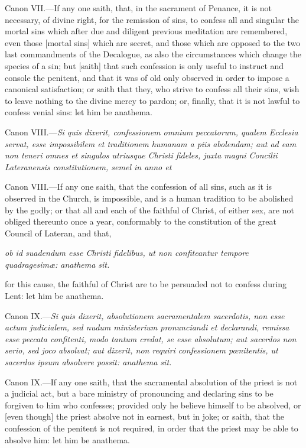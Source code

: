 Canon VII.—If any one saith, that, in the sacrament of Penance, it is not necessary, of divine right, for the remission of sins, to confess all and singular the mortal sins which after due and diligent previous meditation are remembered, even those [mortal sins] which are secret, and those which are opposed to the two last commandments of the Decalogue, as also the circumstances which change the species of a sin; but [saith] that such confession is only useful to instruct and console the penitent, and that it was of old only observed in order to impose a canonical satisfaction; or saith that they, who strive to confess all their sins, wish to leave nothing to the divine mercy to pardon; or, finally, that it is not lawful to confess venial sins: let him be anathema.

Canon VIII.—\emph{Si quis dixerit, confessionem omnium peccatorum, qualem Ecclesia servat, esse impossibilem et traditionem humanam a piis abolendam; aut ad eam non teneri omnes et singulos utriusque Christi fideles, juxta magni Concilii Lateranensis constitutionem, semel in anno et }

Canon VIII.—If any one saith, that the confession of all sins, such as it is observed in the Church, is impossible, and is a human tradition to be abolished by the godly; or that all and each of the faithful of Christ, of either sex, are not obliged thereunto once a year, conformably to the constitution of the great Council of Lateran, and that,

\emph{ob id suadendum esse Christi fidelibus, ut non confiteantur tempore quadragesimæ: anathema sit.}

for this cause, the faithful of Christ are to be persuaded not to confess during Lent: let him be anathema.

Canon IX.—\emph{Si quis dixerit, absolutionem sacramentalem sacerdotis, non esse actum judicialem, sed nudum ministerium pronunciandi et declarandi, remissa esse peccata confitenti, modo tantum credat, se esse absolutum; aut sacerdos non serio, sed joco absolvat; aut dixerit, non requiri confessionem pœnitentis, ut sacerdos ipsum absolvere possit: anathema sit.}

Canon IX.—If any one saith, that the sacramental absolution of the priest is not a judicial act, but a bare ministry of pronouncing and declaring sins to be forgiven to him who confesses; provided only he believe himself to be absolved, or [even though] the priest absolve not in earnest, but in joke; or saith, that the confession of the penitent is not required, in order that the priest may be able to absolve him: let him be anathema.

